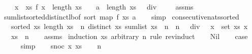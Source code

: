 \begin{isabellebody}
\ \ \ {\isachardoublequoteopen}{\isacharparenleft}{\isasymSum}\ x\ {\isasymleftarrow}\ xs{\isachardot}\ f\ x{\isacharparenright}\ {\isasymge}\ length\ xs\ {\isacharasterisk}\ {\isacharparenleft}{}\ {\isacharasterisk}\ a\ {\isacharplus}\ length\ xs\ {\isacharplus}\ {}{\isacharparenright}\ div\ {}{\isachardoublequoteclose}\isanewline
%
\isadelimproof
\ \ %
\endisadelimproof
%
\isatagproof
{}\isamarkupfalse%
\ assms\isanewline
\ \ \isamarkupfalse%
\ sum{\isacharunderscore}list{\isacharunderscore}sorted{\isacharunderscore}distinct{\isacharunderscore}lb{\isacharbrackleft}of\ {\isachardoublequoteopen}sort\ {\isacharparenleft}map\ f\ xs{\isacharparenright}{\isachardoublequoteclose}\ a{\isacharbrackright}\isanewline
\ \ \isamarkupfalse%
\ simp%
\endisatagproof
{\isafoldproof}%
%
\isadelimproof
\isanewline
%
\endisadelimproof
\isanewline
{}\isamarkupfalse%
\ consecutive{\isacharunderscore}nats{\isacharunderscore}sorted{\isacharcolon}\isanewline
\ \ \ {\isachardoublequoteopen}sorted\ xs{\isachardoublequoteclose}\ {\isachardoublequoteopen}length\ xs\ {\isacharequal}\ n{\isachardoublequoteclose}\ {\isachardoublequoteopen}distinct\ xs{\isachardoublequoteclose}\ {\isachardoublequoteopen}sum{\isacharunderscore}list\ xs\ {\isasymle}\ n\ {\isacharasterisk}\ {\isacharparenleft}n\ {\isacharplus}\ {}{\isacharparenright}\ div\ {}{\isachardoublequoteclose}\ {\isachardoublequoteopen}{\isasymforall}\ x\ {\isasymin}\ set\ xs{\isachardot}\ x\ {\isachargreater}\ {}{\isachardoublequoteclose}\isanewline
\ \ \ {\isachardoublequoteopen}xs\ {\isacharequal}\ {\isacharbrackleft}{}{\isachardot}{\isachardot}{\isacharless}n{\isacharplus}{}{\isacharbrackright}{\isachardoublequoteclose}\isanewline
%
\isadelimproof
\ \ %
\endisadelimproof
%
\isatagproof
{}\isamarkupfalse%
\ assms\isanewline
{}\isamarkupfalse%
\ {\isacharparenleft}induction\ xs\ arbitrary{\isacharcolon}\ n\ rule{\isacharcolon}\ rev{\isacharunderscore}induct{\isacharparenright}\isanewline
\ \ \isamarkupfalse%
\ Nil\isanewline
\ \ \isamarkupfalse%
\ {\isacharquery}case\isanewline
\ \ \ \ \isamarkupfalse%
\ simp\isanewline
{}\isamarkupfalse%
\isanewline
\ \ \isamarkupfalse%
\ {\isacharparenleft}snoc\ x\ xs{\isacharparenright}\isanewline
\ \ \isamarkupfalse%
\ {\isachardoublequoteopen}n\ {\isachargreater}\ {}{\isachardoublequoteclose}\isanewline

\end{isabellebody}
